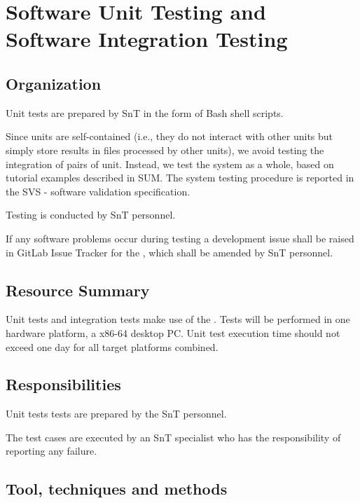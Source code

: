 
\chapter{Software Unit Testing and Software Integration Testing}

\section{Organization}
\label{sec:SUTSIT:org}

Unit tests are prepared by SnT in the form of Bash shell scripts. 

Since units are self-contained (i.e., they do not interact with other units but simply store results in files processed by other units), we avoid testing the integration of pairs of unit. Instead, we test the system as a whole, based on tutorial examples described in SUM. The system testing procedure is reported in the SVS - software validation specification.

Testing is conducted by SnT personnel.

If any software problems occur during testing a development issue shall be raised in GitLab Issue Tracker for the \FAQAS, which shall be amended by SnT personnel.



\section{Resource Summary}

Unit tests and integration tests make use of the \FAQAS. Tests will be performed in one hardware platform, a x86-64 desktop PC. Unit test execution time should not exceed one day for all target platforms combined.

\section{Responsibilities}

Unit tests tests are prepared by the SnT personnel.

The test cases are executed by an SnT specialist who has the responsibility of reporting any failure.

\section{Tool, techniques and methods}

